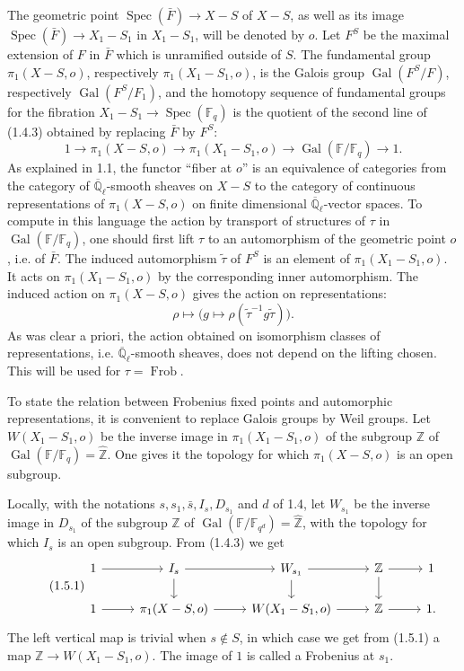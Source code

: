 \documentclass[10pt]{article}
\newcommand{\Fq}{\mathbb F_q}
\newcommand{\Fb}{\mathbb F}
\newcommand{\Ql}{\overline{\mathbb Q}_{\ell}}
\newcommand{\Zhat}{\widehat{\mathbb Z}}
\newcommand{\Gal}{\operatorname{Gal}}
\newcommand{\Spec}{\operatorname{Spec}}
\newcommand{\Frob}{\operatorname{Frob}}
\theoremstyle{deligne}
\newcommand{\heading}[1]{\vspace{0.7em}\noindent{\bfseries #1}\quad}
\begin{document}
The geometric point $\Spec(\bar F)\to X-S$ of $X-S$, as well as its image $\Spec(\bar F)\to X_1-S_1$ in $X_1-S_1$, will be denoted by $o$. Let $F^S$ be the maximal extension of $F$ in $\bar F$ which is unramified outside of $S$. The fundamental group $\pi_1(X-S,o)$, respectively $\pi_1(X_1-S_1,o)$, is the Galois group $\Gal(F^S/F)$, respectively $\Gal(F^S/F_1)$, and the homotopy sequence of fundamental groups for the fibration $X_1-S_1\to\Spec(\Fq)$ is the quotient of the second line of (1.4.3) obtained by replacing $\bar F$ by $F^S$:
\begin{equation}\tag{1.4.4}
1\longrightarrow \pi_1(X-S,o)\longrightarrow \pi_1(X_1-S_1,o)
\longrightarrow\Gal(\Fb/\Fq)\longrightarrow1.
\end{equation}
As explained in 1.1, the functor ``fiber at $o$'' is an equivalence of categories from the category of $\Ql$-smooth sheaves on $X-S$ to the category of continuous representations of $\pi_1(X-S,o)$ on finite dimensional $\Ql$-vector spaces. To compute in this language the action by transport of structures of $\tau$ in $\Gal(\Fb/\Fq)$, one should first lift $\tau$ to an automorphism of the geometric point $o$, i.e. of $\bar F$. The induced automorphism $\tilde\tau$ of $F^S$ is an element of $\pi_1(X_1-S_1,o)$. It acts on $\pi_1(X_1-S_1,o)$ by the corresponding inner automorphism. The induced action on $\pi_1(X-S,o)$ gives the action on representations:
\[
 \rho\longmapsto\bigl(g\longmapsto\rho(\tilde\tau^{-1}g\tilde\tau)\bigr).
\]
As was clear a priori, the action obtained on isomorphism classes of representations, i.e. $\Ql$-smooth sheaves, does not depend on the lifting chosen. This will be used for $\tau=\Frob$.

\heading{1.5.} To state the relation between Frobenius fixed points and automorphic representations, it is convenient to replace Galois groups by Weil groups. Let $W(X_1-S_1,o)$ be the inverse image in $\pi_1(X_1-S_1,o)$ of the subgroup $\mathbb Z$ of $\Gal(\Fb/\Fq)=\Zhat$. One gives it the topology for which $\pi_1(X-S,o)$ is an open subgroup.

Locally, with the notations $s,s_1,\bar s,I_s,D_{s_1}$ and $d$ of 1.4, let $W_{s_1}$ be the inverse image in $D_{s_1}$ of the subgroup $\mathbb Z$ of $\Gal(\Fb/\mathbb F_{q^d})=\Zhat$, with the topology for which $I_s$ is an open subgroup. From (1.4.3) we get
\begin{equation}\tag{1.5.1}
\begin{tikzcd}[column sep=2.6em,row sep=1.5em]
1 \arrow[r] & I_s \arrow[r] \arrow[d] & W_{s_1} \arrow[r] \arrow[d] & \mathbb Z \arrow[r] \arrow[d] & 1\\
1 \arrow[r] & \pi_1(X-S,o) \arrow[r] & W(X_1-S_1,o) \arrow[r] & \mathbb Z \arrow[r] & 1 .
\end{tikzcd}
\end{equation}
The left vertical map is trivial when $s\notin S$, in which case we get from (1.5.1) a map $\mathbb Z\to W(X_1-S_1,o)$. The image of $1$ is called a Frobenius at $s_1$.
\end{document}
